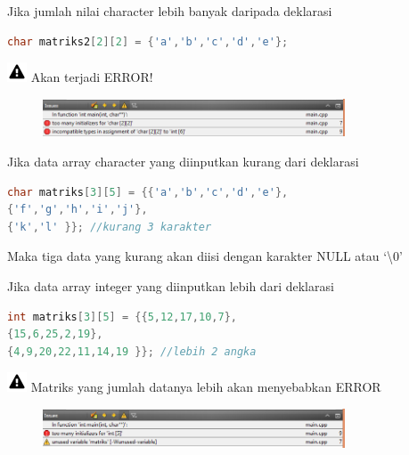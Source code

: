 Jika jumlah nilai character lebih banyak daripada deklarasi

\begin{lstlisting}[language=c++, numbers=none]
char matriks2[2][2] = {'a','b','c','d','e'};
\end{lstlisting}

\includegraphics{../manuscript/images/warning.PNG} Akan terjadi ERROR!

\begin{figure}[htbp]
\centering
\includegraphics[width=0.8\textwidth]{../manuscript/images/capture3-10.PNG}

\end{figure}

Jika data array character yang diinputkan kurang dari deklarasi

\begin{lstlisting}[language=c++, numbers=none]
char matriks[3][5] = {{'a','b','c','d','e'},
{'f','g','h','i','j'},
{'k','l' }}; //kurang 3 karakter
\end{lstlisting}

Maka tiga data yang kurang akan diisi dengan karakter NULL atau `\textbackslash{}0'

Jika data array integer yang diinputkan lebih dari deklarasi

\begin{lstlisting}[language=c++, numbers=none]
int matriks[3][5] = {{5,12,17,10,7},
{15,6,25,2,19},
{4,9,20,22,11,14,19 }}; //lebih 2 angka
\end{lstlisting}

\includegraphics{../manuscript/images/warning.PNG} Matriks yang jumlah datanya lebih akan menyebabkan ERROR


\begin{figure}
\centering
\includegraphics[width=0.8\textwidth]{../manuscript/images/capture3-9.PNG}
\end{figure}




